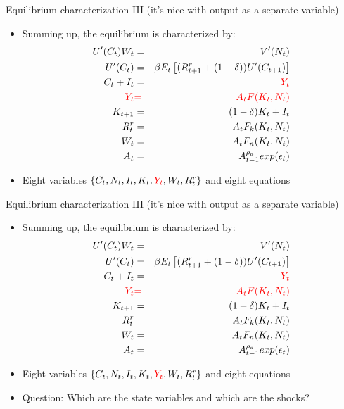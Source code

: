 \documentclass[9pt,xcolor={dvipsnames}]{beamer}
\newcommand{\bit}{\begin{itemize}}
\newcommand{\eit}{\end{itemize}}
\newcommand{\rc}{\color{red}}
\begin{document}
\begin{frame}{Equilibrium characterization III (it's nice with output as a separate variable)}

\bit
\setlength\itemsep{1.5em}

\item Summing up, the equilibrium is characterized by:
\begin{eqnarray}
U'(C_t)W_t &=& V'(N_t) \nonumber \\
U'(C_t) &=& \beta E_t\left[(R^{r}_{t+1}+(1-\delta)) U'(C_{t+1}) \right] \nonumber \\
C_t + I_t &=& {\rc Y_t} \nonumber \\
{\rc Y_t} &{\color{red}=}& {\color{red}A_t F(K_t, N_t)} \nonumber \\
K_{t+1} &=& (1-\delta) K_t + I_t \nonumber \\
R^{r}_t &=& A_t F_k (K_t, N_t) \nonumber \\
W_t &=& A_t F_n (K_t, N_t) \nonumber \\
A_t &=& A_{t-1}^{\rho_a}exp(\epsilon_t) \nonumber
\end{eqnarray}

\item {\rc Eight} variables $\{C_t, N_t, I_t, K_{t}, {\rc Y_t}, W_t, R^{r}_t\}$ and {\rc eight} equations
\eit

\end{frame}

\begin{frame}{Equilibrium characterization III (it's nice with output as a separate variable)}

\bit
\setlength\itemsep{1.5em}

\item Summing up, the equilibrium is characterized by:
\begin{eqnarray}
U'(C_t)W_t &=& V'(N_t) \nonumber \\
U'(C_t) &=& \beta E_t\left[(R^{r}_{t+1}+(1-\delta)) U'(C_{t+1}) \right] \nonumber \\
C_t + I_t &=& {\rc Y_t} \nonumber \\
{\rc Y_t} &{\color{red}=}& {\color{red}A_t F(K_t, N_t)} \nonumber \\
K_{t+1} &=& (1-\delta) K_t + I_t \nonumber \\
R^{r}_t &=& A_t F_k (K_t, N_t) \nonumber \\
W_t &=& A_t F_n (K_t, N_t) \nonumber \\
A_t &=& A_{t-1}^{\rho_a}exp(\epsilon_t) \nonumber
\end{eqnarray}

\item {\rc Eight} variables $\{C_t, N_t, I_t, K_{t}, {\rc Y_t}, W_t, R^{r}_t\}$ and {\rc eight} equations

\item Question: Which are the state variables and which are the shocks?
\eit

\end{frame}
\end{document}
